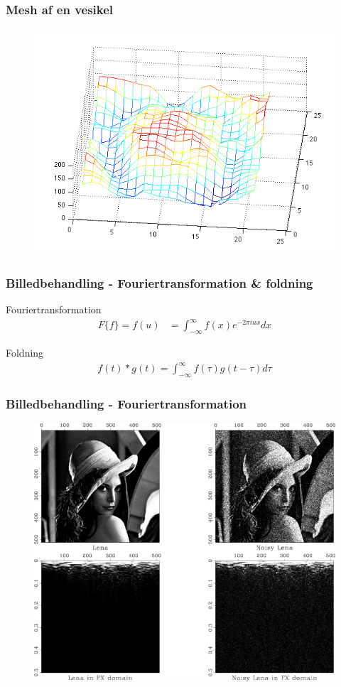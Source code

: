 \documentclass[12pt,t]{beamer}
\begin{document}
\begin{frame}
\frametitle{Mesh af en vesikel}
\begin{figure}[H]
	\centering
	\includegraphics[scale=0.4]{img/ves/mesh.png}
\end{figure}
\end{frame}

\begin{frame}
\frametitle{Billedbehandling - Fouriertransformation \& foldning}
Fouriertransformation
\begin{align*}
	F\{f\} = f(u) &= \int_{-\infty}^{\infty} f(x) e^{-2 \pi i u x} dx
\end{align*}

Foldning
\begin{align*}
	f(t)*g(t)=\int_{-\infty}^{\infty}f(\tau)g(t-\tau)d\tau
\end{align*}
\end{frame}

\begin{frame}
\frametitle{Billedbehandling - Fouriertransformation}
\begin{figure}[H]
\includegraphics[scale=0.33]{img/billedbeh/lenaex.png}
\end{figure}
\end{frame}
\end{document}
